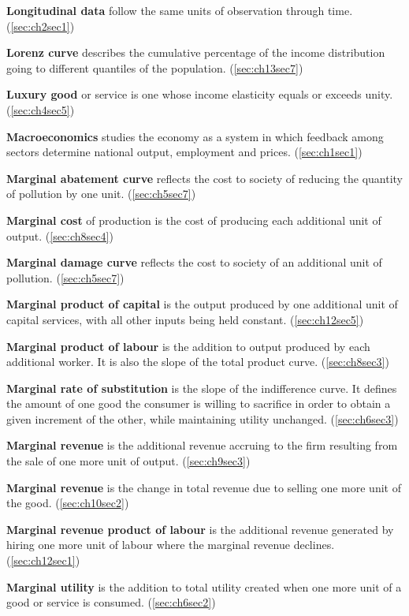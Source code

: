 \textbf{Longitudinal data} follow the same units of observation through time. (\ref{sec:ch2sec1})

\textbf{Lorenz curve} describes the cumulative percentage of the income distribution going to different quantiles of the population. (\ref{sec:ch13sec7})

\textbf{Luxury good} or service is one whose income elasticity equals or exceeds unity. (\ref{sec:ch4sec5})

\textbf{Macroeconomics} studies the economy as a system in which feedback among sectors determine national output, employment and prices. (\ref{sec:ch1sec1})

\textbf{Marginal abatement curve} reflects the cost to society of reducing the quantity of pollution by one unit. (\ref{sec:ch5sec7})

\textbf{Marginal cost} of production is the cost of producing each additional unit of output. (\ref{sec:ch8sec4})

\textbf{Marginal damage curve} reflects the cost to society of an additional unit of pollution. (\ref{sec:ch5sec7})

\textbf{Marginal product of capital} is the output produced by one additional unit of capital services, with all other inputs being held constant. (\ref{sec:ch12sec5})

\textbf{Marginal product of labour} is the addition to output produced by each additional worker. It is also the slope of the total product curve. (\ref{sec:ch8sec3})

\textbf{Marginal rate of substitution} is the slope of the indifference curve. It defines the amount of one good the consumer is willing to sacrifice in order to obtain a given increment of the other, while maintaining utility unchanged. (\ref{sec:ch6sec3})

\textbf{Marginal revenue} is the additional revenue accruing to the firm resulting from the sale of one more unit of output. (\ref{sec:ch9sec3})

\textbf{Marginal revenue} is the change in total revenue due to selling one more unit of the good. (\ref{sec:ch10sec2})

\textbf{Marginal revenue product of labour} is the additional revenue generated by hiring one more unit of labour where the marginal revenue declines. (\ref{sec:ch12sec1})

\textbf{Marginal utility} is the addition to total utility created when one more unit of a good or service is consumed. (\ref{sec:ch6sec2})

